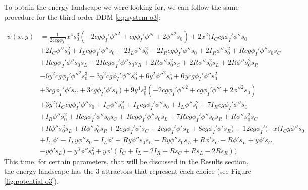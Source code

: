 \documentclass[../main.tex]{subfiles}
\begin{document}
To obtain the energy landscape we  were looking for, we can follow the same procedure for the third order DDM \eqref{eq:system-o3}:


\begin{equation}
\begin{aligned}
\psi(x,y)&= \frac{1}{24 c g \phi_I'} x^{4} s_{0}^{3} (- 2 c g \phi_I' \phi''^{2} + c g \phi_I' \phi''' + 2 \phi''^{2} s_{0}) + 2 x^{2} (I_{C} c g \phi_I' \phi'' s_{0}\\
&+ 2 I_{C} \phi'' s_{0}^{2} + I_{L} c g \phi_I' \phi'' s_{0} + 2 I_{L} \phi'' s_{0}^{2} - 2 I_{R} c g \phi_I' \phi'' s_{0} + 2 I_{R} \phi'' s_{0}^{2} + R c g \phi_I' \phi'' s_{0} s_{C}  \\
&+ R c g \phi_I' \phi'' s_{0} s_{L} - 2 R c g \phi_I' \phi'' s_{0} s_{R} + 2 R \phi'' s_{0}^{2} s_{C} + 2 R \phi'' s_{0}^{2} s_{L} + 2 R \phi'' s_{0}^{2} s_{R}\\
& - 6 y^{2} c g \phi_I' \phi''^{2} s_{0}^{3} + 3 y^{2} c g \phi_I' \phi''' s_{0}^{3} + 6 y^{2} \phi''^{2} s_{0}^{4} + 6 y c g \phi_I' \phi'' s_{0}^{2}  \\
& + 3 c g \phi_I' \phi' s_{C} + 3 c g \phi_I' \phi' s_{L}) + 9 y^{4} s_{0}^{3} (- 2 c g \phi_I' \phi''^{2} + c g \phi_I' \phi''' + 2 \phi''^{2} s_{0}) \\
& + 3 y^{2} (I_{C} c g \phi_I' \phi'' s_{0} + I_{C} \phi'' s_{0}^{2} + I_{L} c g \phi_I' \phi'' s_{0} + I_{L} \phi'' s_{0}^{2} + 7 I_{R} c g \phi_I' \phi'' s_{0}  \\
& +   I_{R} \phi'' s_{0}^{2} + R c g \phi_I' \phi'' s_{0} s_{C} + R c g \phi_I' \phi'' s_{0} s_{L} + 7 R c g \phi_I' \phi'' s_{0} s_{R} + R \phi'' s_{0}^{2} s_{C} \\
& + R \phi'' s_{0}^{2} s_{L} + R \phi'' s_{0}^{2} s_{R} + 2 c g \phi_I' \phi' s_{C} + 2 c g \phi_I' \phi' s_{L} + 8 c g \phi_I' \phi' s_{R}) + 12 c g \phi_I' (- x (I_{C} y \phi'' s_{0}\\
& + I_{C} \phi' - I_{L} y \phi'' s_{0} - I_{L} \phi' + R y \phi'' s_{0} s_{C} - R y \phi'' s_{0} s_{L} + R \phi' s_{C} - R \phi' s_{L} + y \phi' s_{C}  \\
& - y \phi' s_{L}) - y^{3} \phi'' s_{0}^{2} + y \phi' (I_{C} + I_{L} - 2 I_{R} + R s_{C} + R s_{L} - 2 R s_{R}))
\end{aligned}
\label{eq:potential-o3}
\end{equation}
This time, for certain parameters, that will be discussed in the Results section, the energy landscape has the 3 attractors that represent each choice (see Figure \ref{fig:potential-o3}).
\end{document}
